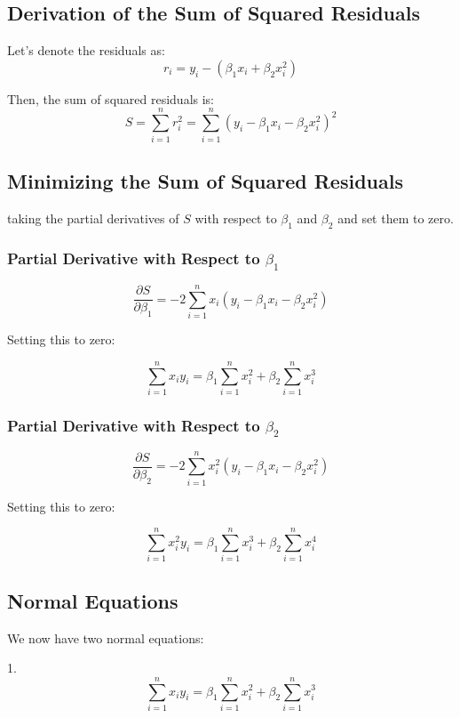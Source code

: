 \documentclass[12pt]{article}
\begin{document}
\subsection*{Derivation of the Sum of Squared Residuals}

Let's denote the residuals as:
\[
r_i = y_i - (\beta_1 x_i + \beta_2 x_i^2)
\]

Then, the sum of squared residuals is:
\[
S = \sum_{i=1}^n r_i^2 = \sum_{i=1}^n \left( y_i - \beta_1 x_i - \beta_2 x_i^2 \right)^{2}
\]

\subsection*{Minimizing the Sum of Squared Residuals}

taking the partial derivatives of \( S \) with respect to \(\beta_1\) and \(\beta_2\) and set them to zero.

\subsubsection*{Partial Derivative with Respect to \(\beta_1\)}

\[
\frac{\partial S}{\partial \beta_1} = -2 \sum_{i=1}^n x_i \left( y_i - \beta_1 x_i - \beta_2 x_i^2 \right)
\]

Setting this to zero:

\[
\sum_{i=1}^n x_i y_i = \beta_1 \sum_{i=1}^n x_i^2 + \beta_2 \sum_{i=1}^n x_i^3
\]

\subsubsection*{Partial Derivative with Respect to \(\beta_2\)}

\[
\frac{\partial S}{\partial \beta_2} = -2 \sum_{i=1}^n x_i^2 \left( y_i - \beta_1 x_i - \beta_2 x_i^2 \right)
\]

Setting this to zero:

\[
\sum_{i=1}^n x_i^2 y_i = \beta_1 \sum_{i=1}^n x_i^3 + \beta_2 \sum_{i=1}^n x_i^4
\]

\subsection*{Normal Equations}

We now have two normal equations:

1. \[
\sum_{i=1}^n x_i y_i = \beta_1 \sum_{i=1}^n x_i^2 + \beta_2 \sum_{i=1}^n x_i^3
\]
\end{document}
